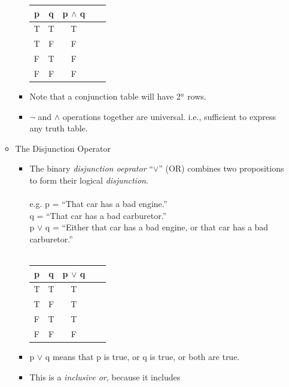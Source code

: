 \documentclass[english, 11pt]{article}
\begin{document}
\begin{addmargin}[2em]{2em}
\begin{addmargin}[1em]{2em}
\begin{itemize}
\begin{itemize}
\begin{itemize}
\begin{tabular}{cc|ccc}
                      p & q & p  $\wedge$  q \\
                      \hline
                      T & T & T  \\
                      T & F & F  \\
                      F & T & F  \\
                      F & F & F
                    \end{tabular}
                    \item Note that a conjunction table will have 2$^n$ rows.
                    \item $\neg$ and $\wedge$ operations together are universal.
                    i.e., sufficient to express any truth table.
                  \end{itemize}
                  \item The Disjunction Operator
                    \begin{itemize}
                      \item The binary \textit{disjunction oeprator} ``$\vee$'' (OR)
                      combines two propositions to form their logical \textit{disjunction}.
                       \\
                       \\
                      e.g. p = ``That car has a bad engine.''
                        \\
                        q = ``That car has a bad carburetor.''
                        \\
                        p $\vee$ q = ``Either that car has a bad engine, or
                        that car has a bad carburetor.''
                        \\
                        \\
                        \begin{tabular}{cc|ccc}
                          p & q & p  $\vee$  q \\
                          \hline
                          T & T & T  \\
                          T & F & T  \\
                          F & T & T  \\
                          F & F & F
                        \end{tabular}
                        \item p $\vee$ q means that p is true, or q is true,
                        or both are true.
                        \item This is a \textit{inclusive or}, because it includes

\end{itemize}
\end{itemize}
\end{itemize}
\end{addmargin}
\end{addmargin}
\end{document}
